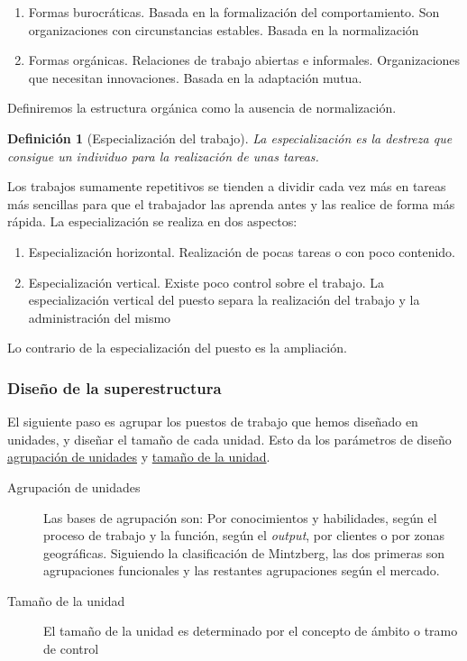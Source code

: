 \documentclass[12pt]{article}
\theoremstyle{definition_wo_parentheses}
\newtheorem{definicion}{Definición}[section]
\begin{document}
\begin{enumerate}
\item Formas burocráticas. Basada en la formalización del comportamiento. Son organizaciones con circunstancias estables. Basada en la normalización
\item Formas orgánicas. Relaciones de trabajo abiertas e informales. Organizaciones que necesitan innovaciones. Basada en la adaptación mutua.
\end{enumerate}

Definiremos la estructura orgánica como la ausencia de normalización. 

\begin{definicion}[Especialización del trabajo] 
	La especialización es la destreza que consigue un individuo para la realización de unas tareas.
\end{definicion}

Los trabajos sumamente repetitivos se tienden a dividir cada vez más en tareas más sencillas para que el trabajador las aprenda antes y las realice de forma más rápida. La especialización se realiza en dos aspectos:

\begin{enumerate}[a]
\item Especialización horizontal. Realización de pocas tareas o con poco contenido.
\item Especialización vertical. Existe poco control sobre el trabajo. La especialización vertical del puesto separa la realización del trabajo y la administración del mismo
\end{enumerate}

Lo contrario de la especialización del puesto es la ampliación.

\subsubsection{Diseño de la superestructura}

El siguiente paso es agrupar los puestos de trabajo que hemos diseñado en unidades, y diseñar el tamaño de cada unidad. Esto da los parámetros de diseño \underline{agrupación de unidades} y \underline{tamaño de la unidad}.


\begin{description}
\item [Agrupación de unidades] Las bases de agrupación son: Por conocimientos y habilidades, según el proceso de trabajo y la función, según el \textit{output}, por clientes o por zonas geográficas. Siguiendo la clasificación de Mintzberg, las dos primeras son agrupaciones funcionales y las restantes agrupaciones según el mercado.

\item [Tamaño de la unidad] El tamaño de la unidad es determinado por el concepto de ámbito o tramo de control
\end{description}
\end{document}
